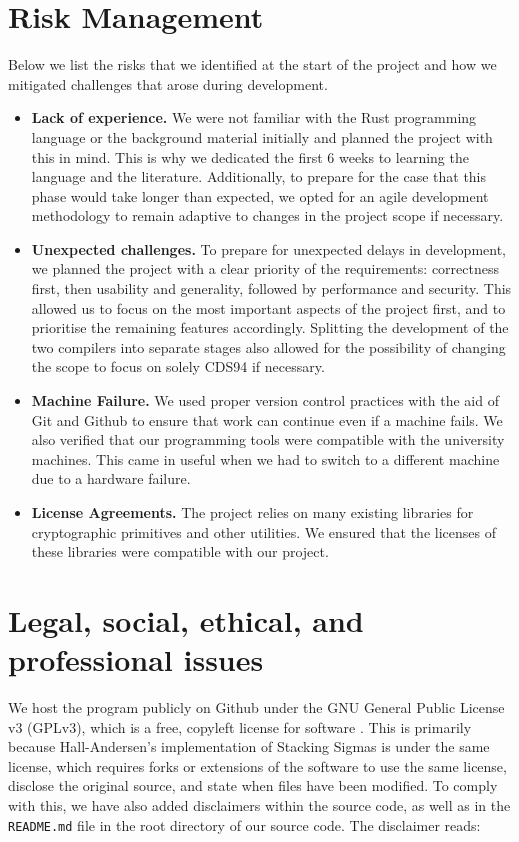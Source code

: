 \section{Risk Management}
Below we list the risks that we identified at the start of the project and how we mitigated
challenges that arose during development.
\begin{itemize}
  \item \textbf{Lack of experience.} We were not familiar with the Rust programming
  language or the background material initially and planned the project with this in mind. This 
  is why we dedicated the first 6 weeks to learning the language and the literature. Additionally,
  to prepare for the case that this phase would take longer than expected, we opted for an agile 
  development methodology to remain adaptive to changes in the project scope if necessary.
  \item \textbf{Unexpected challenges.} To prepare for unexpected delays in development, we 
  planned the project with a clear priority of the requirements: correctness first, then 
  usability and generality, followed by performance and security. This allowed us to focus on
  the most important aspects of the project first, and to prioritise the remaining features
  accordingly. Splitting the development of the two compilers into separate stages also allowed 
  for the possibility of changing the scope to focus on solely CDS94 if necessary. 
  \item \textbf{Machine Failure.} We used proper version control practices with the aid of 
  Git and Github to ensure that work can continue even if a machine fails. We also verified 
  that our programming tools were compatible with the university machines. This came in useful 
  when we had to switch to a different machine due to a hardware failure.
  \item \textbf{License Agreements.} The project relies on many existing libraries for 
  cryptographic primitives and other utilities. We ensured that the licenses of these libraries
  were compatible with our project. 
\end{itemize}

\section{Legal, social, ethical, and professional issues}
We host the program publicly on Github under the GNU General Public License v3 (GPLv3), which is a free, copyleft license for software \cite{GPLv3}. This is primarily because Hall-Andersen's implementation of Stacking Sigmas is under the same license, which requires forks or extensions of the software to use the same license, disclose the original source, and state when files have been modified. To comply with this, we have also added disclaimers within the source code, as well as in the \texttt{README.md} file in the root directory of our source code. The disclaimer reads:

